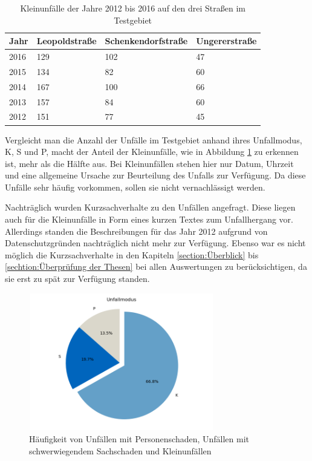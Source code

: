\begin{table}[htpb]
	\scriptsize
	\caption[Kleinunfälle der Jahre 2012 bis 2016 auf den drei Straßen im Testgebiet]{Kleinunfälle der Jahre 2012 bis 2016 auf den drei Straßen im Testgebiet}\label{tab:Kleinunfälle}
	\centering
	\begin{tabular}{l  l l p{2cm}}
		\toprule
		Jahr & Leopoldstraße & Schenkendorfstraße & Ungererstraße \\
		\midrule
		2016 & 129 & 102 & 47\\
		2015 & 134 & 82 & 60\\
		2014 & 167 & 100 & 66\\
		2013 & 157 & 84 & 60\\
		2012 & 151 & 77 & 45\\
		\bottomrule
	\end{tabular}
\end{table}

Vergleicht man die Anzahl der Unfälle im Testgebiet anhand ihres Unfallmodus, \acf{K}, \acf{S} und \acf{P}, macht der Anteil der Kleinunfälle, wie in Abbildung \ref{fig:Unfallmodus} zu erkennen ist, mehr als die Hälfte aus. Bei Kleinunfällen stehen hier nur Datum, Uhrzeit und eine allgemeine Ursache zur Beurteilung des Unfalls zur Verfügung. Da diese Unfälle sehr häufig vorkommen, sollen sie nicht vernachlässigt werden.

Nachträglich wurden Kurzsachverhalte zu den Unfällen angefragt. Diese liegen auch für die Kleinunfälle in  Form eines kurzen Textes zum Unfallhergang vor. Allerdings standen die Beschreibungen für das Jahr 2012 aufgrund von Datenschutzgründen nachträglich nicht mehr zur Verfügung. Ebenso war es nicht möglich die Kurzsachverhalte in den Kapiteln \ref{section:Überblick} bis \ref{sechtion:Überprüfung der Thesen} bei allen Auswertungen zu berücksichtigen, da sie erst zu spät zur Verfügung standen.

\begin{savenotes}
	\begin{figure}[H]
		\centering
		\includegraphics[width=8.1cm,height=6cm]{figures/Unfallmodus}
		\caption[Häufigkeit des Unfallmoduses]{Häufigkeit von Unfällen mit Personenschaden, Unfällen mit schwerwiegendem Sachschaden und Kleinunfällen}\label{fig:Unfallmodus}
	\end{figure}
\end{savenotes}

